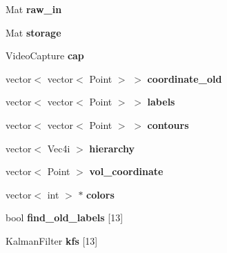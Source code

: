 \begin{DoxyCompactItemize}
\item 
Mat {\bfseries raw\+\_\+in}\hypertarget{classvision_a8be17d4889ad9b9154f3d90825893b70}{}\label{classvision_a8be17d4889ad9b9154f3d90825893b70}

\item 
Mat {\bfseries storage}\hypertarget{classvision_adf6eda2658af488a78cbf3d4e9fc9612}{}\label{classvision_adf6eda2658af488a78cbf3d4e9fc9612}

\item 
Video\+Capture {\bfseries cap}\hypertarget{classvision_a6ce35c3216f36f741a0fab54e815d820}{}\label{classvision_a6ce35c3216f36f741a0fab54e815d820}

\item 
vector$<$ vector$<$ Point $>$ $>$ {\bfseries coordinate\+\_\+old}\hypertarget{classvision_a3d8aa1ce75f36f4bb0c2270100a1a0df}{}\label{classvision_a3d8aa1ce75f36f4bb0c2270100a1a0df}

\item 
vector$<$ vector$<$ Point $>$ $>$ {\bfseries labels}\hypertarget{classvision_a2a7fa3ec56b81484eb06c0f5c068365a}{}\label{classvision_a2a7fa3ec56b81484eb06c0f5c068365a}

\item 
vector$<$ vector$<$ Point $>$ $>$ {\bfseries contours}\hypertarget{classvision_a77ade58544c4db2587686e73d227cc37}{}\label{classvision_a77ade58544c4db2587686e73d227cc37}

\item 
vector$<$ Vec4i $>$ {\bfseries hierarchy}\hypertarget{classvision_a04a535405c5d7b076299073194f497b4}{}\label{classvision_a04a535405c5d7b076299073194f497b4}

\item 
vector$<$ Point $>$ {\bfseries vol\+\_\+coordinate}\hypertarget{classvision_a4f28ab3ac6e168aa977725da1973399b}{}\label{classvision_a4f28ab3ac6e168aa977725da1973399b}

\item 
vector$<$ int $>$ $\ast$ {\bfseries colors}\hypertarget{classvision_a7a1ac84ff70026be06b4ffe17fb0f3aa}{}\label{classvision_a7a1ac84ff70026be06b4ffe17fb0f3aa}

\item 
bool {\bfseries find\+\_\+old\+\_\+labels} \mbox{[}13\mbox{]}\hypertarget{classvision_a08b91dbb2384d4c6bd78560ec6621246}{}\label{classvision_a08b91dbb2384d4c6bd78560ec6621246}

\item 
Kalman\+Filter {\bfseries kfs} \mbox{[}13\mbox{]}\hypertarget{classvision_a76bf5d0bd645d4db2d9535bacae1284f}{}\label{classvision_a76bf5d0bd645d4db2d9535bacae1284f}


\end{DoxyCompactItemize}
